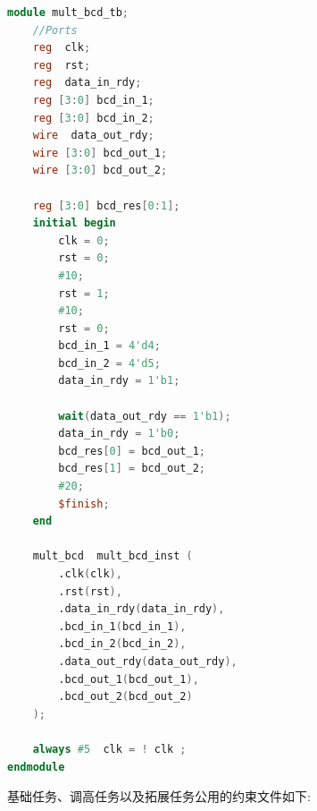 \documentclass{article}
\begin{document}
\begin{lstlisting}[language=Verilog, caption={BCD乘法器仿真文件}]
module mult_bcd_tb;
    //Ports
    reg  clk;
    reg  rst;
    reg  data_in_rdy;
    reg [3:0] bcd_in_1;
    reg [3:0] bcd_in_2;
    wire  data_out_rdy;
    wire [3:0] bcd_out_1;
    wire [3:0] bcd_out_2;

    reg [3:0] bcd_res[0:1];
    initial begin
        clk = 0;
        rst = 0;
        #10;
        rst = 1;
        #10;
        rst = 0;
        bcd_in_1 = 4'd4;
        bcd_in_2 = 4'd5;
        data_in_rdy = 1'b1;

        wait(data_out_rdy == 1'b1);
        data_in_rdy = 1'b0;
        bcd_res[0] = bcd_out_1;
        bcd_res[1] = bcd_out_2;
        #20;
        $finish;
    end

    mult_bcd  mult_bcd_inst (
        .clk(clk),
        .rst(rst),
        .data_in_rdy(data_in_rdy),
        .bcd_in_1(bcd_in_1),
        .bcd_in_2(bcd_in_2),
        .data_out_rdy(data_out_rdy),
        .bcd_out_1(bcd_out_1),
        .bcd_out_2(bcd_out_2)
    );

    always #5  clk = ! clk ;
endmodule
\end{lstlisting}
基础任务、调高任务以及拓展任务公用的约束文件如下:
\end{document}
